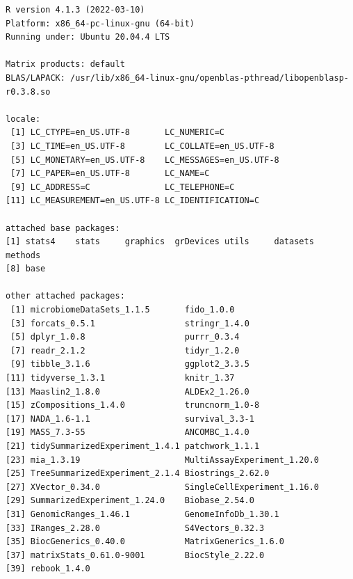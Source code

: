 \documentclass[
]{book}
\begin{document}
\begin{verbatim}
R version 4.1.3 (2022-03-10)
Platform: x86_64-pc-linux-gnu (64-bit)
Running under: Ubuntu 20.04.4 LTS

Matrix products: default
BLAS/LAPACK: /usr/lib/x86_64-linux-gnu/openblas-pthread/libopenblasp-r0.3.8.so

locale:
 [1] LC_CTYPE=en_US.UTF-8       LC_NUMERIC=C              
 [3] LC_TIME=en_US.UTF-8        LC_COLLATE=en_US.UTF-8    
 [5] LC_MONETARY=en_US.UTF-8    LC_MESSAGES=en_US.UTF-8   
 [7] LC_PAPER=en_US.UTF-8       LC_NAME=C                 
 [9] LC_ADDRESS=C               LC_TELEPHONE=C            
[11] LC_MEASUREMENT=en_US.UTF-8 LC_IDENTIFICATION=C       

attached base packages:
[1] stats4    stats     graphics  grDevices utils     datasets  methods  
[8] base     

other attached packages:
 [1] microbiomeDataSets_1.1.5       fido_1.0.0                    
 [3] forcats_0.5.1                  stringr_1.4.0                 
 [5] dplyr_1.0.8                    purrr_0.3.4                   
 [7] readr_2.1.2                    tidyr_1.2.0                   
 [9] tibble_3.1.6                   ggplot2_3.3.5                 
[11] tidyverse_1.3.1                knitr_1.37                    
[13] Maaslin2_1.8.0                 ALDEx2_1.26.0                 
[15] zCompositions_1.4.0            truncnorm_1.0-8               
[17] NADA_1.6-1.1                   survival_3.3-1                
[19] MASS_7.3-55                    ANCOMBC_1.4.0                 
[21] tidySummarizedExperiment_1.4.1 patchwork_1.1.1               
[23] mia_1.3.19                     MultiAssayExperiment_1.20.0   
[25] TreeSummarizedExperiment_2.1.4 Biostrings_2.62.0             
[27] XVector_0.34.0                 SingleCellExperiment_1.16.0   
[29] SummarizedExperiment_1.24.0    Biobase_2.54.0                
[31] GenomicRanges_1.46.1           GenomeInfoDb_1.30.1           
[33] IRanges_2.28.0                 S4Vectors_0.32.3              
[35] BiocGenerics_0.40.0            MatrixGenerics_1.6.0          
[37] matrixStats_0.61.0-9001        BiocStyle_2.22.0              
[39] rebook_1.4.0                  


\end{verbatim}
\end{document}
